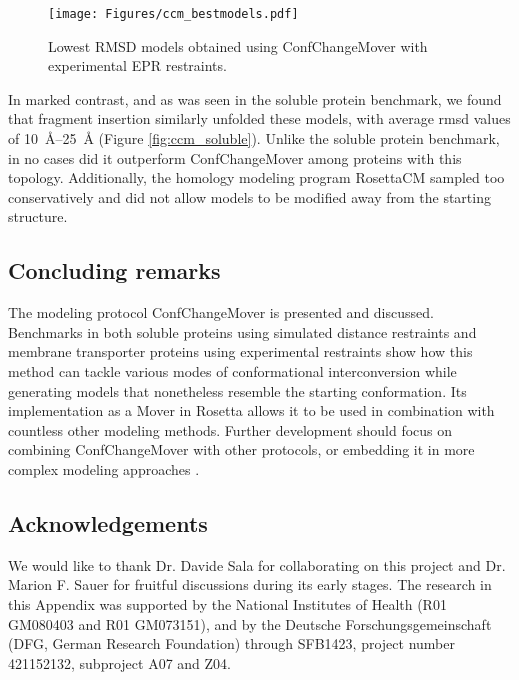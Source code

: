 \begin{figure}[h!]
\centering
\texttt{[image: Figures/ccm\_bestmodels.pdf]}
 \caption[Lowest RMSD models obtained using ConfChangeMover with experimental EPR restraints.]{Lowest RMSD models obtained using ConfChangeMover with experimental EPR restraints.}
\label{fig:ccm_bestmodels}
\end{figure}

In marked contrast, and as was seen in the soluble protein benchmark, we found that fragment insertion similarly unfolded these models, with average \gls{rmsd} values of \SIrange{10}{25}{\angstrom} (Figure \ref{fig:ccm_soluble}). Unlike the soluble protein benchmark, in no cases did it outperform ConfChangeMover among proteins with this topology. Additionally, the homology modeling program RosettaCM sampled too conservatively and did not allow models to be modified away from the starting structure.

\subsection{Concluding remarks}

The modeling protocol ConfChangeMover is presented and discussed. Benchmarks in both soluble proteins using simulated distance restraints and membrane transporter proteins using experimental restraints show how this method can tackle various modes of conformational interconversion while generating models that nonetheless resemble the starting conformation. Its implementation as a Mover in Rosetta allows it to be used in combination with countless other modeling methods. Further development should focus on combining ConfChangeMover with other protocols, or embedding it in more complex modeling approaches \citep*{Park2018}.

\subsection{Acknowledgements}

We would like to thank Dr. Davide Sala for collaborating on this project and Dr. Marion F. Sauer for fruitful discussions during its early stages. The research in this Appendix was supported by the National Institutes of Health (R01 GM080403 and R01 GM073151), and by the Deutsche Forschungsgemeinschaft (DFG, German Research Foundation) through SFB1423, project number 421152132, subproject A07 and Z04. 